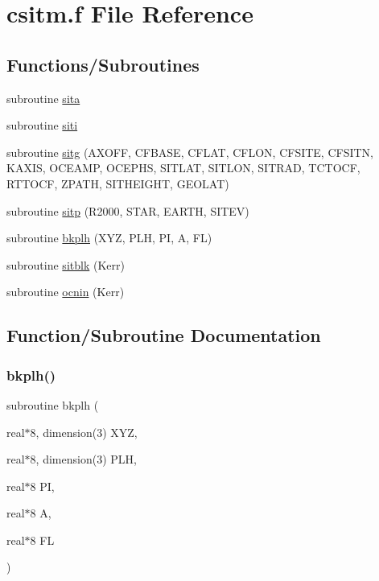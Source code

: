 \hypertarget{csitm_8f}{}\section{csitm.\+f File Reference}
\label{csitm_8f}
\subsection*{Functions/\+Subroutines}
\begin{DoxyCompactItemize}
\item 
subroutine \hyperlink{csitm_8f_a9601fba281579c0631d439803ca96317}{sita}
\item 
subroutine \hyperlink{csitm_8f_aa9d490db42c8398a747838ceed61e6d4}{siti}
\item 
subroutine \hyperlink{csitm_8f_ae33d05b01559c9c88ffe00c97a87d9e0}{sitg} (A\+X\+O\+FF, C\+F\+B\+A\+SE, C\+F\+L\+AT, C\+F\+L\+ON, C\+F\+S\+I\+TE, C\+F\+S\+I\+TN, K\+A\+X\+IS, O\+C\+E\+A\+MP, O\+C\+E\+P\+HS, S\+I\+T\+L\+AT, S\+I\+T\+L\+ON, S\+I\+T\+R\+AD, T\+C\+T\+O\+CF, R\+T\+T\+O\+CF, Z\+P\+A\+TH, S\+I\+T\+H\+E\+I\+G\+HT, G\+E\+O\+L\+AT)
\item 
subroutine \hyperlink{csitm_8f_a00ed5e4e02b263376d7c95b892957e3c}{sitp} (R2000, S\+T\+AR, E\+A\+R\+TH, S\+I\+T\+EV)
\item 
subroutine \hyperlink{csitm_8f_afcf454f0870373286c49c69ffb2375c0}{bkplh} (X\+YZ, P\+LH, PI, A, FL)
\item 
subroutine \hyperlink{csitm_8f_ae97b72650e85eae768f87ff9ba943531}{sitblk} (Kerr)
\item 
subroutine \hyperlink{csitm_8f_a640a106fb8f7ce53f206e6381b7fd067}{ocnin} (Kerr)
\end{DoxyCompactItemize}


\subsection{Function/\+Subroutine Documentation}
\mbox{\label{csitm_8f_afcf454f0870373286c49c69ffb2375c0}} 
\subsubsection{\texorpdfstring{bkplh()}{bkplh()}}
{\footnotesize\ttfamily subroutine bkplh (\begin{DoxyParamCaption}\item[{real$\ast$8, dimension(3)}]{X\+YZ,  }\item[{real$\ast$8, dimension(3)}]{P\+LH,  }\item[{real$\ast$8}]{PI,  }\item[{real$\ast$8}]{A,  }\item[{real$\ast$8}]{FL }\end{DoxyParamCaption})}



